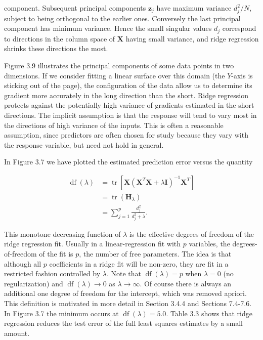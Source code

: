 \documentclass[10pt]{article}
\begin{document}
component. Subsequent principal components $\mathbf{z}_{j}$ have maximum variance $d_{j}^{2} / N$, subject to being orthogonal to the earlier ones. Conversely the last principal component has minimum variance. Hence the small singular values $d_{j}$ correspond to directions in the column space of $\mathbf{X}$ having small variance, and ridge regression shrinks these directions the most.

Figure 3.9 illustrates the principal components of some data points in two dimensions. If we consider fitting a linear surface over this domain (the $Y$-axis is sticking out of the page), the configuration of the data allow us to determine its gradient more accurately in the long direction than the short. Ridge regression protects against the potentially high variance of gradients estimated in the short directions. The implicit assumption is that the response will tend to vary most in the directions of high variance of the inputs. This is often a reasonable assumption, since predictors are often chosen for study because they vary with the response variable, but need not hold in general.

In Figure 3.7 we have plotted the estimated prediction error versus the quantity


\begin{align*}
\operatorname{df}(\lambda) & =\operatorname{tr}\left[\mathbf{X}\left(\mathbf{X}^{T} \mathbf{X}+\lambda \mathbf{I}\right)^{-1} \mathbf{X}^{T}\right] \\
& =\operatorname{tr}\left(\mathbf{H}_{\lambda}\right) \\
& =\sum_{j=1}^{p} \frac{d_{j}^{2}}{d_{j}^{2}+\lambda} . \tag{3.50}
\end{align*}


This monotone decreasing function of $\lambda$ is the effective degrees of freedom of the ridge regression fit. Usually in a linear-regression fit with $p$ variables, the degrees-of-freedom of the fit is $p$, the number of free parameters. The idea is that although all $p$ coefficients in a ridge fit will be non-zero, they are fit in a restricted fashion controlled by $\lambda$. Note that $\operatorname{df}(\lambda)=p$ when $\lambda=0$ (no regularization) and $\operatorname{df}(\lambda) \rightarrow 0$ as $\lambda \rightarrow \infty$. Of course there is always an additional one degree of freedom for the intercept, which was removed apriori. This definition is motivated in more detail in Section 3.4.4 and Sections 7.4-7.6. In Figure 3.7 the minimum occurs at $\operatorname{df}(\lambda)=5.0$. Table 3.3 shows that ridge regression reduces the test error of the full least squares estimates by a small amount.
\end{document}
